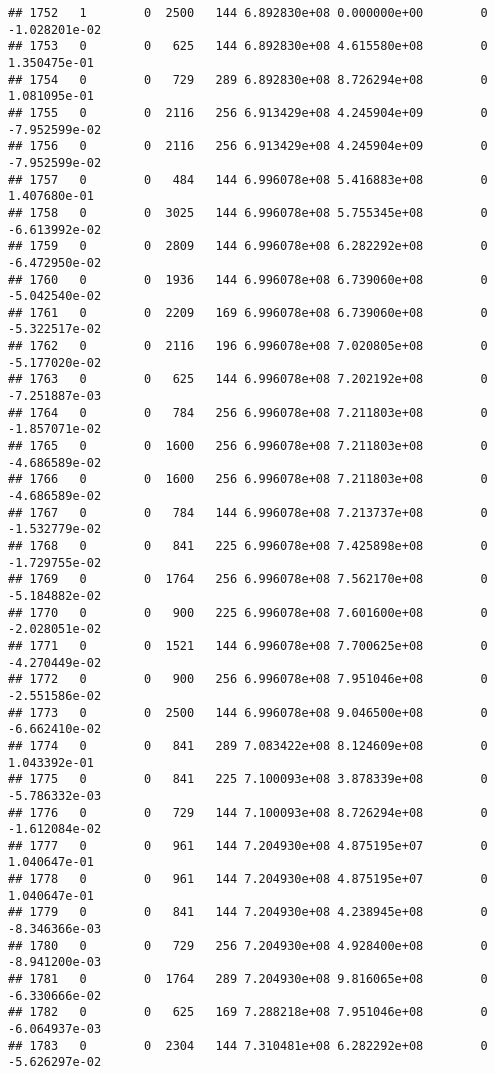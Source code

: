 \documentclass[
]{article}
\begin{document}
\begin{enumerate}
\begin{verbatim}
## 1752   1        0  2500   144 6.892830e+08 0.000000e+00        0 -1.028201e-02
## 1753   0        0   625   144 6.892830e+08 4.615580e+08        0  1.350475e-01
## 1754   0        0   729   289 6.892830e+08 8.726294e+08        0  1.081095e-01
## 1755   0        0  2116   256 6.913429e+08 4.245904e+09        0 -7.952599e-02
## 1756   0        0  2116   256 6.913429e+08 4.245904e+09        0 -7.952599e-02
## 1757   0        0   484   144 6.996078e+08 5.416883e+08        0  1.407680e-01
## 1758   0        0  3025   144 6.996078e+08 5.755345e+08        0 -6.613992e-02
## 1759   0        0  2809   144 6.996078e+08 6.282292e+08        0 -6.472950e-02
## 1760   0        0  1936   144 6.996078e+08 6.739060e+08        0 -5.042540e-02
## 1761   0        0  2209   169 6.996078e+08 6.739060e+08        0 -5.322517e-02
## 1762   0        0  2116   196 6.996078e+08 7.020805e+08        0 -5.177020e-02
## 1763   0        0   625   144 6.996078e+08 7.202192e+08        0 -7.251887e-03
## 1764   0        0   784   256 6.996078e+08 7.211803e+08        0 -1.857071e-02
## 1765   0        0  1600   256 6.996078e+08 7.211803e+08        0 -4.686589e-02
## 1766   0        0  1600   256 6.996078e+08 7.211803e+08        0 -4.686589e-02
## 1767   0        0   784   144 6.996078e+08 7.213737e+08        0 -1.532779e-02
## 1768   0        0   841   225 6.996078e+08 7.425898e+08        0 -1.729755e-02
## 1769   0        0  1764   256 6.996078e+08 7.562170e+08        0 -5.184882e-02
## 1770   0        0   900   225 6.996078e+08 7.601600e+08        0 -2.028051e-02
## 1771   0        0  1521   144 6.996078e+08 7.700625e+08        0 -4.270449e-02
## 1772   0        0   900   256 6.996078e+08 7.951046e+08        0 -2.551586e-02
## 1773   0        0  2500   144 6.996078e+08 9.046500e+08        0 -6.662410e-02
## 1774   0        0   841   289 7.083422e+08 8.124609e+08        0  1.043392e-01
## 1775   0        0   841   225 7.100093e+08 3.878339e+08        0 -5.786332e-03
## 1776   0        0   729   144 7.100093e+08 8.726294e+08        0 -1.612084e-02
## 1777   0        0   961   144 7.204930e+08 4.875195e+07        0  1.040647e-01
## 1778   0        0   961   144 7.204930e+08 4.875195e+07        0  1.040647e-01
## 1779   0        0   841   144 7.204930e+08 4.238945e+08        0 -8.346366e-03
## 1780   0        0   729   256 7.204930e+08 4.928400e+08        0 -8.941200e-03
## 1781   0        0  1764   289 7.204930e+08 9.816065e+08        0 -6.330666e-02
## 1782   0        0   625   169 7.288218e+08 7.951046e+08        0 -6.064937e-03
## 1783   0        0  2304   144 7.310481e+08 6.282292e+08        0 -5.626297e-02

\end{verbatim}
\end{enumerate}
\end{document}
